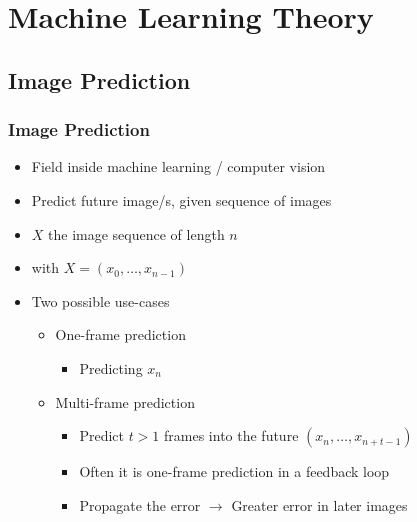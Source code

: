 \section{Machine Learning Theory}
 \subsection{Image Prediction}
  \begin{frame}
   \frametitle{Image Prediction}
   
   \begin{itemize}
    \item<1-> Field inside machine learning / computer vision
    \item<2-> Predict future image/s, given sequence of images
    \item<3-> $X$ the image sequence of length $n$
    \item<4-> with $X = (x_0, \ldots, x_{n-1})$
    \item<5-> Two possible use-cases
    \begin{itemize}
     \item<6-> One-frame prediction
     \begin{itemize}
      \item<7-> Predicting $x_n$
     \end{itemize}
     \item<8-> Multi-frame prediction
     \begin{itemize}
      \item<9-> Predict $t > 1$ frames into the future $(x_n, \ldots, x_{n+t-1})$
      \item<10-> Often it is one-frame prediction in a feedback loop
      \item<11-> Propagate the error $\rightarrow$ Greater error in later images
     \end{itemize}
    \end{itemize}
   \end{itemize}
   
  \end{frame}
 
